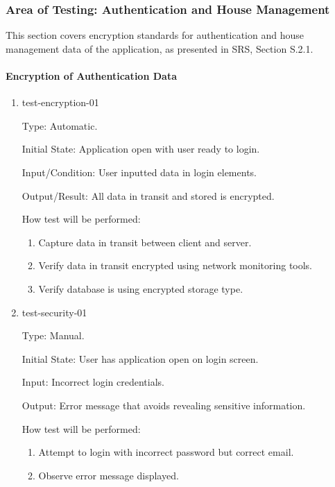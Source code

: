 \documentclass[12pt, titlepage]{article}
\begin{document}
\subsubsection{Area of Testing: Authentication and House Management}
This section covers encryption standards for authentication and house management data of the application, as presented in SRS, Section S.2.1.

\paragraph{Encryption of Authentication Data}

\begin{enumerate}

\item{test-encryption-01\\}

Type: Automatic.
					
Initial State: Application open with user ready to login.
					
Input/Condition: User inputted data in login elements.
					
Output/Result: All data in transit and stored is encrypted.
					
How test will be performed: 
\begin{enumerate}[1.]
	\item Capture data in transit between client and server.
	\item Verify data in transit encrypted using network monitoring tools.
	\item Verify database is using encrypted storage type.
\end{enumerate}
					
\item{test-security-01\\}

Type: Manual.
					
Initial State: User has application open on login screen.
					
Input: Incorrect login credentials.
					
Output: Error message that avoids revealing sensitive information.
					
How test will be performed: 
\begin{enumerate}[1.]
	\item Attempt to login with incorrect password but correct email.
	\item Observe error message displayed.
\end{enumerate}
\end{enumerate}
\end{document}
